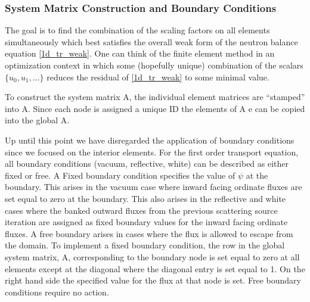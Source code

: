 \subsubsection{System Matrix Construction and Boundary Conditions}

The goal is to find the combination of the scaling factors on all elements simultaneously which best satisfies the overall weak form of the neutron balance equation \ref{1d_tr_weak}.  One can think of the finite element method in an optimization context in which some (hopefully unique) combination of the scalars $\{u_0, u_1, ...\}$ reduces the residual of \ref{1d_tr_weak} to some minimal value.
 
 To construct the system matrix A, the individual element matrices are ``stamped'' into A. Since
each node is assigned a unique ID the elements of A e can be copied into the global A.
 
Up until this point we have disregarded the application of boundary conditions since we focused on the interior elements.  For the first order transport equation, all boundary conditions (vacuum, reflective, white) can be
described as either fixed or free. A Fixed boundary condition specifies the value of $\psi$ at the boundary.
This arises in the vacuum case where inward facing ordinate fluxes are set equal to zero at the
boundary. This also arises in the reflective and white cases where the banked outward fluxes from the
previous scattering source iteration are assigned as fixed boundary values for the inward facing ordinate
fluxes. A free boundary arises in cases where the flux is allowed to escape from the domain.
To implement a fixed boundary condition, the row in the global system matrix, A, corresponding
to the boundary node is set equal to zero at all elements except at the diagonal where the diagonal
entry is set equal to 1. On the right hand side the specified value for the flux at that node is set.
Free boundary conditions require no action.